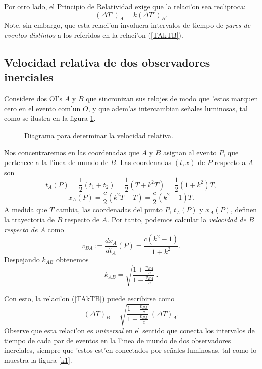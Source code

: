 Por otro lado, el Principio de Relatividad exige que la relaci'on sea rec'iproca:
\begin{equation}
(\Delta T')_A=k (\Delta T')_B .\label{tkt}
\end{equation}
Note, sin embargo, que esta relaci'on involucra intervalos de tiempo de \textit{pares de eventos distintos} a los referidos en la relaci'on (\ref{TAkTB}).

\subsection{Velocidad relativa de dos observadores inerciales}

Considere dos OI's $A$ y $B$ que sincronizan sus relojes de
modo que 'estos marquen cero en el evento com'un $O$, y que adem'as intercambian se\~nales luminosas, tal como se ilustra en la figura \ref{fig:k2}.
\begin{figure}[H]
\centerline{ }
 \caption{Diagrama para determinar la velocidad relativa.}
\label{fig:k2}
\end{figure}
Nos concentraremos en las coordenadas que $A$ y $B$ asignan al evento $P$, que  pertenece a la l'inea de mundo de $B$. Las coordenadas $(t,x)$ de $P$
respecto a $A$ son
\begin{equation}
t_A(P)=\frac{1}{2}(t_1+t_2)=\frac{1}{2}(T + k^2T)=\frac{1}{2}(1+k^2)T,
\end{equation}
\begin{equation}
x_A(P)=\frac{c}{2}(k^2T-T)=\frac{c}{2}(k^2-1)T.
\end{equation}
A medida que $T$ cambia, las coordenadas del punto $P$, $t_A(P)$ y $x_A(P)$, definen la trayectoria de $B$ respecto de $A$. Por tanto, podemos calcular la \textit{velocidad de $B$ respecto de $A$} como
\begin{equation}
v_{BA}:=\frac{dx_A}{dt_A}(P)=\frac{c(k^2-1)}{1+k^2}.
\end{equation}
Despejando $k_{AB}$ obtenemos
\begin{equation}
k_{AB}=\sqrt{\frac{1+\frac{v_{BA}}{c}}{1-\frac{v_{BA}}{c}}} \,.\label{k}
\end{equation}

Con esto, la relaci'on (\ref{TAkTB}) puede escribirse como
\begin{equation}
(\Delta T)_B=\sqrt{\frac{1+\frac{v_{BA}}{c}}{1-\frac{v_{BA}}{c}}}
\,(\Delta T)_A. \label{k2}
\end{equation}
Observe que esta relaci'on es \textit{universal} en el sentido que conecta los intervalos de tiempo de cada par de eventos en la l'inea de mundo de dos observadores inerciales, siempre que 'estos est'en conectados por se\~nales luminosas, tal como lo muestra la figura \ref{k1}.

